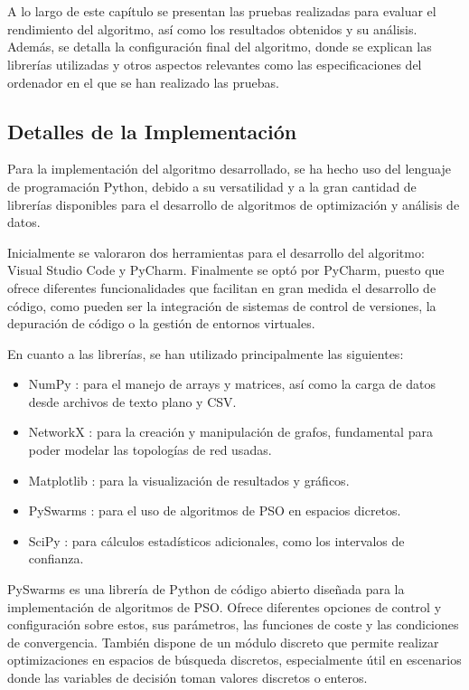 \chapter{\resultsname}\label{chp:results}

A lo largo de este capítulo se presentan las pruebas realizadas para evaluar el rendimiento del algoritmo, así como los resultados obtenidos y su análisis. Además, se detalla la configuración final del algoritmo, donde se explican las librerías utilizadas y otros aspectos relevantes como las especificaciones del ordenador en el que se han realizado las pruebas.

\section{Detalles de la Implementación}

Para la implementación del algoritmo desarrollado, se ha hecho uso del lenguaje de programación Python, debido a su versatilidad y a la gran cantidad de librerías disponibles para el desarrollo de algoritmos de optimización y análisis de datos.

Inicialmente se valoraron dos herramientas para el desarrollo del algoritmo: Visual Studio Code y PyCharm. Finalmente se optó por PyCharm, puesto que ofrece diferentes funcionalidades que facilitan en gran medida el desarrollo de código, como pueden ser la integración de sistemas de control de versiones, la depuración de código o la gestión de entornos virtuales.

En cuanto a las librerías, se han utilizado principalmente las siguientes:
\begin{itemize}
    \item NumPy \cite{numpy}: para el manejo de arrays y matrices, así como la carga de datos desde archivos de texto plano y CSV.
    \item NetworkX \cite{networkx}: para la creación y manipulación de grafos, fundamental para poder modelar las topologías de red usadas.
    \item Matplotlib \cite{matplotlib}: para la visualización de resultados y gráficos.
    \item PySwarms \cite{pyswarms}: para el uso de algoritmos de PSO en espacios dicretos.
    \item SciPy \cite{scipy}: para cálculos estadísticos adicionales, como los intervalos de confianza.
\end{itemize}

PySwarms es una librería de Python de código abierto diseñada para la implementación de algoritmos de PSO. Ofrece diferentes opciones de control y configuración sobre estos, sus parámetros, las funciones de coste y las condiciones de convergencia. También dispone de un módulo discreto que permite realizar optimizaciones en espacios de búsqueda discretos, especialmente útil en escenarios donde las variables de decisión toman valores discretos o enteros.

